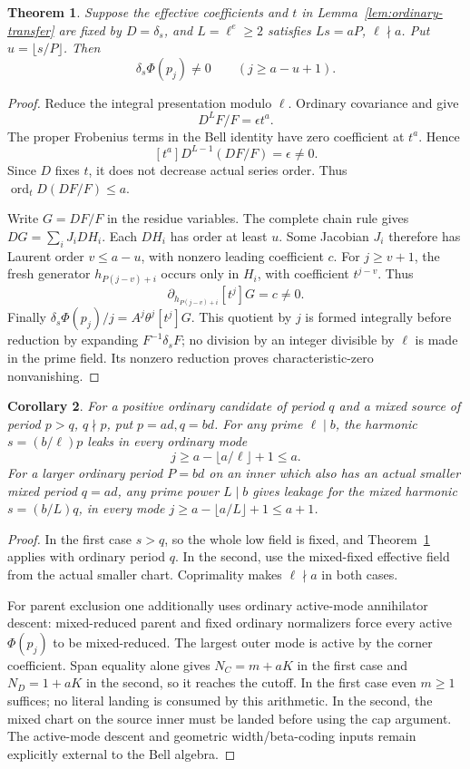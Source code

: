\documentclass[11pt,a4paper]{amsart}
\numberwithin{equation}{section}
\theoremstyle{plain}
\newtheorem{theorem}{Theorem}[section]
\newtheorem{corollary}[theorem]{Corollary}
\theoremstyle{definition}
\begin{document}
\begin{theorem}\label{thm:hall-tail}
Suppose the effective coefficients and \(t\) in Lemma~\ref{lem:ordinary-transfer} are fixed by \(D=\delta_s\), and \(L=\ell^e\ge2\) satisfies \(Ls=aP\), \(\ell\nmid a\).  Put \(u=\lfloor s/P\rfloor\).  Then
\[
 \delta_s\Phi(p_j)\ne0\qquad(j\ge a-u+1).
\]
\end{theorem}
\begin{proof}
Reduce the integral presentation modulo \(\ell\).  Ordinary covariance and  give
\[
 D^LF/F=\epsilon t^a.
\]
The proper Frobenius terms in the Bell identity have zero coefficient at \(t^a\).  Hence
\[
 [t^a]D^{L-1}(DF/F)=\epsilon\ne0.
\]
Since \(D\) fixes \(t\), it does not decrease actual series order.  Thus \(\operatorname{ord}_tD(DF/F)\le a\).

Write \(G=DF/F\) in the residue variables.  The complete chain rule gives \(DG=\sum_iJ_iDH_i\).  Each \(DH_i\) has order at least \(u\).  Some Jacobian \(J_i\) therefore has Laurent order \(v\le a-u\), with nonzero leading coefficient \(c\).  For \(j\ge v+1\), the fresh generator \(h_{P(j-v)+i}\) occurs only in \(H_i\), with coefficient \(t^{j-v}\).  Thus
\[
 \partial_{h_{P(j-v)+i}}[t^j]G=c\ne0.
\]
Finally \(\delta_s\Phi(p_j)/j=A^j\theta^j[t^j]G\).  This quotient by \(j\) is formed integrally before reduction by expanding \(F^{-1}\delta_sF\); no division by an integer divisible by \(\ell\) is made in the prime field.  Its nonzero reduction proves characteristic-zero nonvanishing.
\end{proof}

\begin{corollary}\label{cor:cross-type}
For a positive ordinary candidate of period \(q\) and a mixed source of period \(p>q\), \(q\nmid p\), put \(p=ad,q=bd\).  For any prime \(\ell\mid b\), the harmonic \(s=(b/\ell)p\) leaks in every ordinary mode
\[
 j\ge a-\lfloor a/\ell\rfloor+1\le a.
\]
For a larger ordinary period \(P=bd\) on an inner which also has an actual smaller mixed period \(q=ad\), any prime power \(L\mid b\) gives leakage for the mixed harmonic \(s=(b/L)q\), in every mode \(j\ge a-\lfloor a/L\rfloor+1\le a+1\).
\end{corollary}
\begin{proof}
In the first case \(s>q\), so the whole low field is fixed, and Theorem~\ref{thm:hall-tail} applies with ordinary period \(q\).  In the second, use the mixed-fixed effective field from the actual smaller chart.  Coprimality makes \(\ell\nmid a\) in both cases.

For parent exclusion one additionally uses ordinary active-mode annihilator descent: mixed-reduced parent and fixed ordinary normalizers force every active \(\Phi(p_j)\) to be mixed-reduced.  The largest outer mode is active by the corner coefficient.  Span equality alone gives \(N_C=m+aK\) in the first case and \(N_D=1+aK\) in the second, so it reaches the cutoff.  In the first case even \(m\ge1\) suffices; no literal landing is consumed by this arithmetic.  In the second, the mixed chart on the source inner must be landed before using the cap argument.  The active-mode descent and geometric width/beta-coding inputs remain explicitly external to the Bell algebra.
\end{proof}
\end{document}
